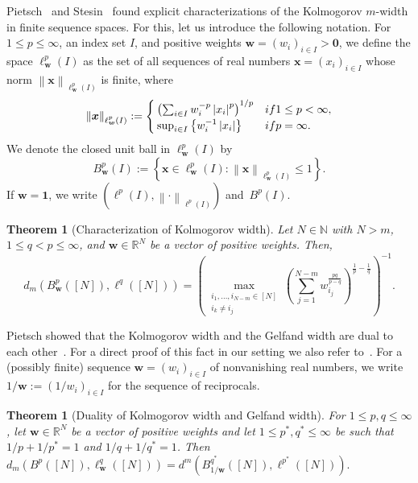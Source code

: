 \documentclass[namedate,webpdf]{ima-authoring-template-blank}
\newcommand*{\nm}[1]{{\left\|#1\right \|}}
\newcommand{\abs}[1]{\left|#1\right|}
\newcounter{counter}
\numberwithin{counter}{section}
\numberwithin{equation}{section}
\theoremstyle{plain}
\newtheorem{theorem}[counter]{Theorem}
\theoremstyle{definition}
\newcommand*{\bbN}{\mathbb{N}}
\newcommand*{\bbR}{\mathbb{R}}
\theoremstyle{thmstyletwo}
\begin{document}
Pietsch~\citep[Thm. 7.2]{pietsch_SNumbersOperatorsBanachSpaces_1974} and Stesin~\citep[Thm. 3]{stesin_AleksandrovDiametersFinitedimensionalSets_1975} found explicit characterizations of the Kolmogorov \(m\)-width in finite sequence spaces. For this, let us introduce the following notation.
For \(1 \leq p \leq \infty\), an index set \(I\), and positive weights \(\bm{w} = (w_i)_{i \in I} > \bm{0}\), we define the space \(\ell_{\bm{w}}^p(I)\) as the set of all sequences of real numbers \(\bm{x} = (x_i)_{i \in I}\) whose norm \(\nm{\bm{x}}_{\ell_{\bm{w}}^p(I)}\) is finite, where
\[
\nm{\bm{x}}_{\ell_{\bm{w}}^p(I)} :=
\begin{cases}
    \left( \sum_{i \in I} w_i^{-p} \abs{x_i}^p \right)^{1/p} & \textup{ if } 1 \leq p < \infty, \\
    \sup_{i \in I} \left\{w_i^{-1} \abs{x_i}\right\} & \textup{ if } p = \infty.
\end{cases}
\]
We denote the closed unit ball in \(\ell_{\bm{w}}^p(I)\) by
\[
B_{\bm{w}}^p(I) := \left\{\bm{x} \in \ell_{\bm{w}}^p(I): \nm{\bm{x}}_{\ell_{\bm{w}}^p(I)} \leq 1 \right\}.
\]
If \(\bm{w} = \bm{1}\), we write \((\ell^p(I), \nm{\cdot}_{\ell^p(I)})\) and~\(B^p(I)\).

\begin{theorem}[Characterization of Kolmogorov width]
\label{thm: Stesin}
    Let \(N \in \bbN\) with \(N > m\), \(1\leq q < p \leq \infty\), and \(\bm{w}\in\bbR^N\) be a vector of positive weights. Then,
    \[
    d_m(B_{\bm{w}}^p([N]), \ell^q([N])) = \left(\max_{\substack{i_1,\dots,i_{N-m}\in[N] \\ i_k \neq i_j}} \left(\sum_{j=1}^{N-m} w_{i_j}^{\frac{pq}{p-q}}\right)^{\frac{1}{p} - \frac{1}{q}}\right)^{-1}.
    \]
\end{theorem}
Pietsch showed that the Kolmogorov width and the Gelfand width are dual to each other~\citep[Thm. 6.2]{pietsch_SNumbersOperatorsBanachSpaces_1974}. For a direct proof of this fact in our setting we also refer to~\citet[Thm. B.3]{adcock_OptimalApproximationInfinitedimensionalHolomorphic_2024}. For a (possibly finite) sequence \(\bm{w} = (w_i)_{i \in I}\) of nonvanishing real numbers, we write \(1/\bm{w} := (1/w_i)_{i \in I}\) for the sequence of reciprocals.
\begin{theorem}[Duality of Kolmogorov width and Gelfand width]
\label{thm: Gelfand width dual Kolmogorov width}
    For \(1\leq p,q \leq \infty\), let \(\bm{w}\in\bbR^N\) be a vector of positive weights and let \(1 \leq p^*, q^* \leq \infty\) be such that \(1/p + 1/p^* = 1\) and \(1/q + 1/q^* = 1\). Then
    \(
    d_m(B^p([N]), \ell_{\bm{w}}^q([N])) = d^m(B_{1/\bm{w}}^{q^*}([N]), \ell^{p^*}([N])). 
    \)
\end{theorem}
\end{document}
